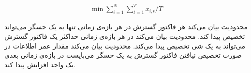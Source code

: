 \begin{align}
  \min \sum_{i = 1}^{N} \sum_{t = 1}^{T} x_{i, t} / T
\end{align}


محدودیت  بیان می‌کند هر فاکتور گسترش در هر بازه‌ی زمانی تنها به یک حسگر می‌تواند تخصیص پیدا کند.
محدودیت  بیان می‌کند در هر بازه‌ی زمانی حداکثر یک فاکتور گسترش می‌تواند به یک شی تخصیص پیدا می‌کند.
محدودیت  بیان می‌کند مقدار عمر اطلاعات در صورت تخصیص نیافتن فاکتور گسترش به یک حسگر می‌بایست در بازه‌ی زمانی بعدی یک واحد افزایش پیدا کند.
